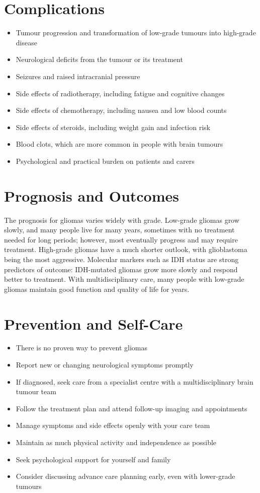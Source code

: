 \section*{Complications}
\begin{itemize}
    \item Tumour progression and transformation of low-grade tumours into high-grade disease
    \item Neurological deficits from the tumour or its treatment
    \item Seizures and raised intracranial pressure
    \item Side effects of radiotherapy, including fatigue and cognitive changes
    \item Side effects of chemotherapy, including nausea and low blood counts
    \item Side effects of steroids, including weight gain and infection risk
    \item Blood clots, which are more common in people with brain tumours
    \item Psychological and practical burden on patients and carers
\end{itemize}

\section*{Prognosis and Outcomes}
The prognosis for gliomas varies widely with grade. Low-grade gliomas grow slowly, and many people live for many years, sometimes with no treatment needed for long periods; however, most eventually progress and may require treatment. High-grade gliomas have a much shorter outlook, with glioblastoma being the most aggressive. Molecular markers such as IDH status are strong predictors of outcome: IDH-mutated gliomas grow more slowly and respond better to treatment. With multidisciplinary care, many people with low-grade gliomas maintain good function and quality of life for years.

\section*{Prevention and Self-Care}
\begin{itemize}
    \item There is no proven way to prevent gliomas
    \item Report new or changing neurological symptoms promptly
    \item If diagnosed, seek care from a specialist centre with a multidisciplinary brain tumour team
    \item Follow the treatment plan and attend follow-up imaging and appointments
    \item Manage symptoms and side effects openly with your care team
    \item Maintain as much physical activity and independence as possible
    \item Seek psychological support for yourself and family
    \item Consider discussing advance care planning early, even with lower-grade tumours
\end{itemize}

